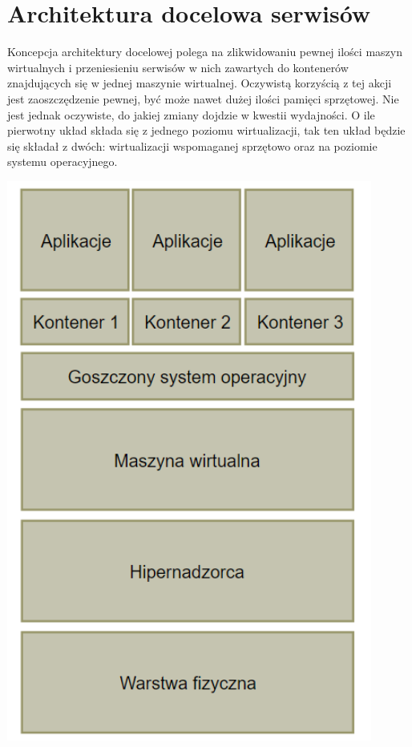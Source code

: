 \documentclass[polish, a4paper, 12pt, oneside]{book}
\begin{document}
	\section{Architektura docelowa serwisów}
	Koncepcja architektury docelowej polega na zlikwidowaniu pewnej ilości maszyn wirtualnych i przeniesieniu serwisów w nich zawartych do kontenerów znajdujących się w jednej maszynie wirtualnej. Oczywistą korzyścią z tej akcji jest zaoszczędzenie pewnej, być może nawet dużej ilości  pamięci sprzętowej. Nie jest jednak oczywiste, do jakiej zmiany dojdzie w kwestii wydajności. O ile pierwotny układ składa się z jednego poziomu wirtualizacji, tak ten układ będzie się składał z dwóch: wirtualizacji wspomaganej sprzętowo oraz na poziomie systemu operacyjnego.
	\begin{center}
		\includegraphics[width=120mm]{schemat_archdoc.png}
	\end{center}
	
\end{document}
